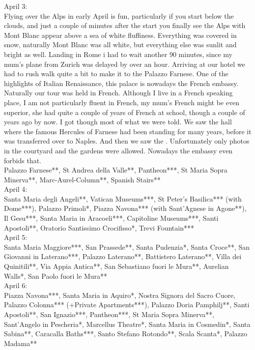 April 3:\\
Flying over the Alps in early April is fun, particularly if you start below the clouds, and just a couple of minutes after the start you finally see the Alps with Mont Blanc appear above a sea of white fluffiness. Everything was covered in snow, naturally Mont Blanc was all white, but everything else was sunlit and bright as well. Landing in Rome i had to wait another 90 minutes, since my mum's plane from Zurich was delayed by over an hour. Arriving at our hotel we had to rush walk quite a bit to make it to the Palazzo Farnese. One of the highlights of Italian Renaissance, this palace is nowadays the French embassy. Naturally our tour was held in French. Although I live in a French speaking place, I am not particularly fluent in French, my mum's French might be even superior, she had quite a couple of years of French at school, though a couple of years ago by now. I got though most of what we were told. We saw the hall where the famous Hercules of Farnese had been standing for many years, before it was transferred over to Naples. And then we saw the . Unfortunately only photos in the courtyard and the gardens were allowed. Nowadays the embassy even forbids that.\\

Palazzo Farnese**, St Andrea della Valle**, Pantheon***, St Maria Sopra Minerva**, Marc-Aurel-Column**, Spanish Stairs**\\

April 4:\\
Santa Maria degli Angeli**, Vatican Museums***, St Peter's Basilica*** (with Dome***), Palazzo Primoli*, Piazza Navona*** (with Sant'Agnese in Agone**), Il Gesu***, Santa Maria in Aracoeli***, Capitoline Museums***, Santi Apostoli**, Oratorio Santissimo Crocifisso*, Trevi Fountain***\\

April 5:\\
Santa Maria Maggiore***, San Prassede**, Santa Pudenzia*, Santa Croce**, San Giovanni in Laterano***, Palazzo Laterano**, Battistero Laterano**, Villa dei Quinitili**, Via Appia Antica**, San Sebastiano fuori le Mura**, Aurelian Walls*, San Paolo fuori le Mura**\\

April 6:\\
Piazza Navona***, Santa Maria in Aquiro*, Nostra Signora del Sacro Cuore, Palazzo Colonna*** (+Private Apartments***), Palazzo Doria Pamphilj**, Santi Apostoli**, San Ignazio***, Pantheon***, St Maria Sopra Minerva**, Sant'Angelo in Pescheria*, Marcellus Theatre*, Santa Maria in Cosmedin*, Santa Sabina**, Caracalla Baths***, Santo Stefano Rotondo**, Scala Scanta*, Palazzo Madama**\\

